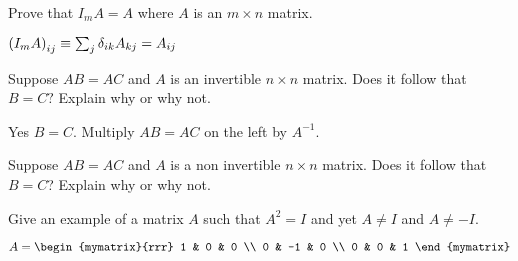 \begin{enumialphparenastyle}

\begin{ex} Prove that $I_{m}A=A$ where $A$ is an $m\times n$ matrix.
\begin{sol}
 $\left(
I_{m}A\right) _{ij}\equiv \sum_{j}\delta _{ik}A_{kj}=A_{ij}$
\end{sol}
\end{ex}

\begin{ex} Suppose $AB=AC$ and $A$ is an invertible $n\times n$ matrix. Does it
follow that $B=C?$ Explain why or why not. 
\begin{sol}
Yes $B=C$. Multiply $AB = AC$ on the left by $A^{-1}$. 
\end{sol}
\end{ex}

\begin{ex} Suppose $AB=AC$ and $A$ is a non invertible $n\times n$ matrix. Does it follow that $B=C$? Explain why or why not.  
\end{ex}

\begin{ex} Give an example of a matrix $A$ such that $A^{2}=I$ and yet $A\neq I$
and $A\neq -I.$ 
\begin{sol}
$A = \begin{mymatrix}{rrr}
1 & 0 & 0 \\
0 & -1 & 0 \\
0 & 0 & 1
\end{mymatrix} $
\end{sol}
\end{ex}

\end{enumialphparenastyle}